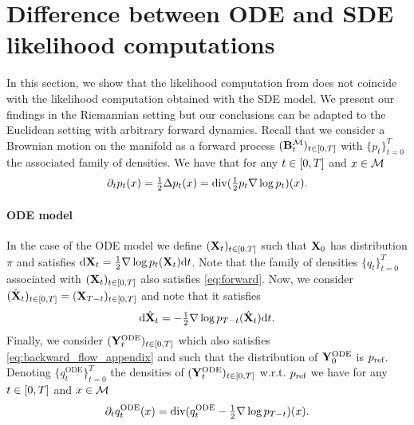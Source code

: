 \section{Difference between ODE and SDE likelihood computations}
\label{sec:diff-betw-ode}

In this section, we show that the likelihood computation from
\cite{song2020score} does not coincide with the likelihood computation
obtained with the SDE model. We present our findings in the Riemannian setting
but our conclusions can be adapted to the Euclidean setting with arbitrary
forward dynamics. Recall that we consider a Brownian motion on the manifold as a forward process
$(\mathbf{B}_t^\mathcal M)_{t \in \left[0,T\right]}$ with $\{p_t\}_{t=0}^T$ the associated family
of densities. We have that for any $t \in \left[0,T\right]$ and $x \in \mathcal M$
\begin{equation}
  \label{eq:forward}
  \partial_t p_t(x) = \tfrac{1}{2} \Delta p_t(x) = \mathrm{div}(\tfrac{1}{2}p_t \nabla \log p_t )(x)  . 
\end{equation}


\paragraph{ODE model}
In the case of the ODE model we define $(\mathbf{X}_t)_{t \in \left[0,T\right]}$ such that
$\mathbf{X}_0$ has distribution $\pi$ and satisfies
$\mathrm{d} \mathbf{X}_t = \tfrac{1}{2}  \nabla \log p_t(\mathbf{X}_t) \mathrm{d} t$. Note that the family of
densities $\{q_t\}_{t=0}^T$ associated with $(\mathbf{X}_t)_{t \in \left[0,T\right]}$ also
satisfies \cref{eq:forward}. Now, we consider
$(\hat{\mathbf{X}}_t)_{t \in \left[0,T\right]} = (\mathbf{X}_{T-t})_{t \in \left[0,T\right]}$ and note that it satisfies
\begin{equation}
  \label{eq:backward_flow_appendix}
 \mathrm{d} \hat{\mathbf{X}}_t = -\tfrac{1}{2}  \nabla \log p_{T-t}(\hat{\mathbf{X}}_t) \mathrm{d} t  .
\end{equation}
Finally, we consider $(\mathbf{Y}_t^{\mathrm{ODE}})_{t \in \left[0,T\right]}$ which also satisfies
\cref{eq:backward_flow_appendix} and such that the distribution of $\mathbf{Y}_0^{\mathrm{ODE}}$ is
$p_{\textup{ref}}$. Denoting $\{q_t^{\mathrm{ODE}}\}_{t=0}^T$ the densities of
$(\mathbf{Y}_t^{\mathrm{ODE}})_{t \in \left[0,T\right]}$ w.r.t. $p_{\textup{ref}}$ we have for any $t \in \left[0,T\right]$ and $x \in \mathcal M$
\begin{equation}
  \label{eq:proba_flow_ode}
 \partial_t q_t^{\mathrm{ODE}}(x) =  \mathrm{div}(q_t^{\mathrm{ODE}} -\tfrac{1}{2} \nabla\log p_{T-t} )(x)  . 
\end{equation}

